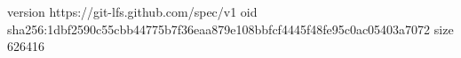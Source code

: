 version https://git-lfs.github.com/spec/v1
oid sha256:1dbf2590c55cbb44775b7f36eaa879e108bbfcf4445f48fe95c0ac05403a7072
size 626416
